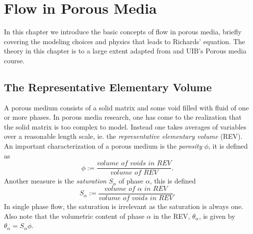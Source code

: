 \documentclass[../Main/main.tex]{subfiles}
\begin{document}
\graphicspath{{../Flow in porous media/figs/}}
\chapter{Flow in Porous Media}
In this chapter we introduce the basic concepts of flow in porous media, briefly covering the modeling choices and physics that leads to Richards' equation. The theory in this chapter is to a large extent adapted from \cite{Nordbotten} and UIB's Porous media course.
\section{The Representative Elementary Volume}\label{REV}
A porous medium consists of a solid matrix and some void filled with fluid of one or more phases. In porous media research, one has come to the realization that the solid matrix is too complex to model. Instead one takes averages of variables over a reasonable length scale, ie. the \emph{representative elementary volume} (REV).
An important characterization of a porous medium is the \emph{porosity} $\phi$, it is defined as 
\begin{equation}
	\phi := \frac{\textit{volume of voids in REV}}{\textit{volume of REV}}.
\end{equation}
Another measure is the \emph{saturation} $S_{\alpha}$ of phase $\alpha$,  this is defined 
\begin{equation}
	S_{\alpha} := \frac{\textit{volume of }\alpha \textit{ in REV}}{\textit{volume of voids in REV}}.
\end{equation}
In single phase flow, the saturation is irrelevant as the saturation is always one. Also note that the volumetric content of phase $\alpha$ in the REV, $\theta_{\alpha}$, is given by $\theta_{\alpha} = S_{\alpha} \phi$.
\end{document}
